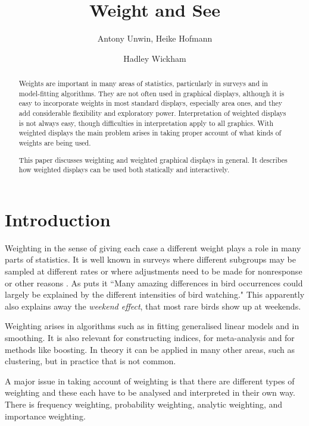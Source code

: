 \documentclass{svmult}
\begin{document}
\title*{Weight and See}
\author{
Antony Unwin, Heike Hofmann  \and Hadley Wickham
}

\maketitle

\begin{abstract}
Weights are important in many areas of statistics, particularly in surveys and in model-fitting algorithms.  They are not often used in graphical displays, although it is easy to incorporate weights in most standard displays, especially area ones, and they add considerable flexibility and exploratory power.  Interpretation of weighted displays is not always easy, though difficulties in interpretation apply to all graphics.   With weighted displays the main problem arises in taking proper account of what kinds of weights are being used.

This paper discusses weighting and weighted graphical displays in general.  It describes how weighted displays can be used both statically and interactively.
\end{abstract}

\section{Introduction}
\label{intro}
Weighting in the sense of giving each case a different weight plays a role in many parts of statistics.  It is well known in surveys where different subgroups may be sampled at different rates or where adjustments need to be made for nonresponse or other reasons \citep{kish:1990}.  As \cite{hampel:1998} puts it ``Many amazing differences in bird occurrences could largely be explained by the different intensities of bird watching."  This apparently also explains away the \textit{weekend effect}, that most rare birds show up at weekends.

Weighting arises in algorithms such as in fitting generalised linear models and in smoothing.  It is also relevant for constructing indices, for meta-analysis and for methods like boosting.  In theory it can be applied in many other areas, such as clustering, but in practice that is not common.

A major issue in taking account of weighting is that there are different types of weighting and these each have to be analysed and interpreted in their own way.  There is frequency weighting, probability weighting, analytic weighting, and importance weighting.
\end{document}
